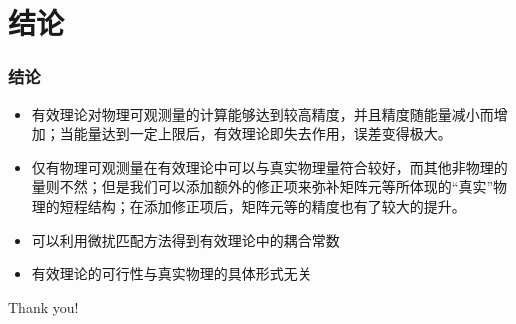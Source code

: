 \documentclass[8pt]{beamer}
\begin{document}
\section{结论}
\begin{frame}
\frametitle{结论}
\begin{itemize}
  \item 有效理论对物理可观测量的计算能够达到较高精度，并且精度随能量减小而增加；当能量达到一定上限后，有效理论即失去作用，误差变得极大。
  \vspace{12pt}
  \item 仅有物理可观测量在有效理论中可以与真实物理量符合较好，而其他非物理的量则不然；但是我们可以添加额外的修正项来弥补矩阵元等所体现的“真实”物理的短程结构；在添加修正项后，矩阵元等的精度也有了较大的提升。
  \vspace{12pt}
  \item 可以利用微扰匹配方法得到有效理论中的耦合常数
  \vspace{12pt}
  \item 有效理论的可行性与真实物理的具体形式无关
\end{itemize}

\end{frame}

%

\begin{frame}
  \Huge
	\begin{center}
	Thank you!
	\end{center}
\end{frame}
\end{document}
